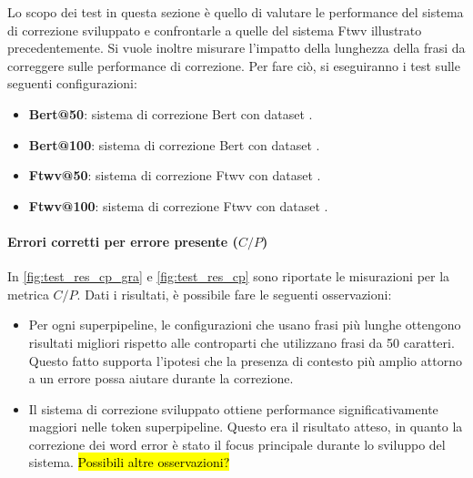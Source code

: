 Lo scopo dei test in questa sezione è quello di valutare le performance del sistema di correzione sviluppato e confrontarle a quelle del sistema Ftwv illustrato precedentemente. Si vuole inoltre misurare l'impatto della lunghezza della frasi da correggere sulle performance di correzione. Per fare ciò, si eseguiranno i test sulle seguenti configurazioni:
\begin{itemize}
\item \textbf{Bert@50}: sistema di correzione Bert con dataset \dsta.
\item \textbf{Bert@100}: sistema di correzione Bert con dataset \dstb.
\item \textbf{Ftwv@50}: sistema di correzione Ftwv con dataset \dsta.
\item \textbf{Ftwv@100}: sistema di correzione Ftwv con dataset \dstb.
\end{itemize}





\paragraph{Errori corretti per errore presente ($C/P$)}
In \autoref{fig:test_res_cp_gra} e \autoref{fig:test_res_cp} sono riportate le misurazioni per la metrica $C/P$. Dati i risultati, è possibile fare le seguenti osservazioni:
\begin{itemize}
\item Per ogni superpipeline, le configurazioni che usano frasi più lunghe ottengono risultati migliori rispetto alle controparti che utilizzano frasi da 50 caratteri. Questo fatto supporta l'ipotesi che la presenza di contesto più amplio attorno a un errore possa aiutare durante la correzione.

\item Il sistema di correzione sviluppato ottiene performance significativamente maggiori nelle token superpipeline. Questo era il risultato atteso, in quanto la correzione dei word error è stato il focus principale durante lo sviluppo del sistema. \hl{Possibili altre osservazioni?}

\end{itemize}

